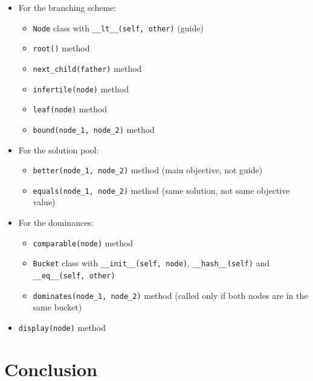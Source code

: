 \documentclass[10pt]{beamer}
\begin{document}
\begin{frame}
  \begin{itemize}
    \item For the branching scheme:
      \begin{itemize}
        \item \texttt{Node} class with \texttt{\_\_lt\_\_(self, other)} (guide)
        \item \texttt{root()} method
        \item \texttt{next\_child(father)} method
        \item \texttt{infertile(node)} method
        \item \texttt{leaf(node)} method
        \item \texttt{bound(node\_1, node\_2)} method
      \end{itemize}
    \item For the solution pool:
      \begin{itemize}
        \item \texttt{better(node\_1, node\_2)} method (main objective, not guide)
        \item \texttt{equals(node\_1, node\_2)} method (same solution, not same objective value)
      \end{itemize}
    \item For the dominances:
      \begin{itemize}
        \item \texttt{comparable(node)} method
        \item \texttt{Bucket} class with \texttt{\_\_init\_\_(self, node)}, \texttt{\_\_hash\_\_(self)} and \texttt{\_\_eq\_\_(self, other)}
        \item \texttt{dominates(node\_1, node\_2)} method (called only if both nodes are in the same bucket)
      \end{itemize}
    \item \texttt{display(node)} method
  \end{itemize}
\end{frame}

\section{Conclusion}
\end{document}
